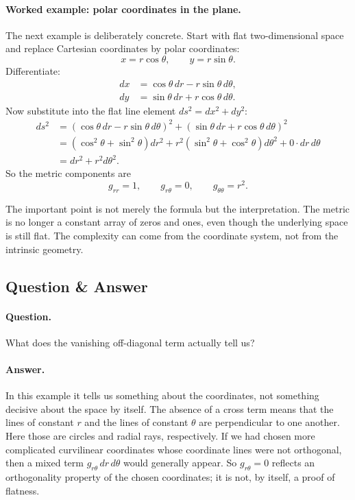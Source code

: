 \paragraph{Worked example: polar coordinates in the plane.} The next example is deliberately concrete. Start with flat two-dimensional space and replace Cartesian coordinates by polar coordinates:
\begin{equation}
x=r\cos\theta,
\qquad
y=r\sin\theta.
\end{equation}
Differentiate:
\begin{align}
dx &= \cos\theta\,dr-r\sin\theta\,d\theta, \\
dy &= \sin\theta\,dr+r\cos\theta\,d\theta.
\end{align}
Now substitute into the flat line element \(ds^{2}=dx^{2}+dy^{2}\):
\begin{align}
ds^{2}
&=
\left(\cos\theta\,dr-r\sin\theta\,d\theta\right)^{2}
+
\left(\sin\theta\,dr+r\cos\theta\,d\theta\right)^{2} \\
&=
\left(\cos^{2}\theta+\sin^{2}\theta\right)dr^{2}
+
r^{2}\left(\sin^{2}\theta+\cos^{2}\theta\right)d\theta^{2}
+
0\cdot dr\,d\theta \\
&=
dr^{2}+r^{2}d\theta^{2}.
\end{align}
So the metric components are
\begin{equation}
g_{rr}=1,
\qquad
g_{r\theta}=0,
\qquad
g_{\theta\theta}=r^{2}.
\end{equation}

The important point is not merely the formula but the interpretation. The metric is no longer a constant array of zeros and ones, even though the underlying space is still flat. The complexity can come from the coordinate system, not from the intrinsic geometry.

\subsection{Question \& Answer}

\paragraph{Question.} What does the vanishing off-diagonal term actually tell us?

\paragraph{Answer.} In this example it tells us something about the coordinates, not something decisive about the space by itself. The absence of a cross term means that the lines of constant \(r\) and the lines of constant \(\theta\) are perpendicular to one another. Here those are circles and radial rays, respectively. If we had chosen more complicated curvilinear coordinates whose coordinate lines were not orthogonal, then a mixed term \(g_{r\theta}\,dr\,d\theta\) would generally appear. So \(g_{r\theta}=0\) reflects an orthogonality property of the chosen coordinates; it is not, by itself, a proof of flatness.

